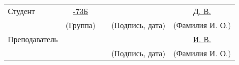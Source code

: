 \noindent
\begin{center}
\begin{tabular}{p{} p{} p{} p{} p{}} 
    Студент       & \multicolumn{1}{c}{\uline{7-73Б\hfill}} & & \uline{\hfill}                           & \multicolumn{1}{c}{\uline{ Д. В.\hfill}}   \\
                  & \multicolumn{1}{c}{\tiny(Группа)}               & & \multicolumn{1}{c}{\tiny(Подпись, дата)} & \multicolumn{1}{c}{\tiny(Фамилия И. О.)}                \\
    Преподаватель &                                                 & & \uline{\hfill}                           & \multicolumn{1}{c}{\uline{ И. В.\hfill}}   \\
                  &                                                 & & \multicolumn{1}{c}{\tiny(Подпись, дата)} & \multicolumn{1}{c}{\tiny(Фамилия И. О.)}                \\
\end{tabular}
\end{center}


\pagebreak

